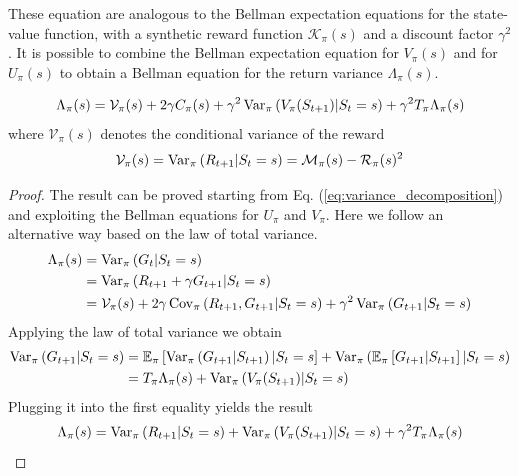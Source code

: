 These equation are analogous to the Bellman expectation equations for the state-value function, with a synthetic reward function $\mathcal{K}_\pi(s)$ and a discount factor $\gamma^2$. It is possible to combine the Bellman expectation equation for $V_\pi(s)$ and for $U_\pi(s)$ to obtain a Bellman equation for the return variance $\Lambda_\pi(s)$.
\begin{proposition}
	\begin{equation}
			\Lambda_\pi(s) = \mathcal{V}_\pi(s) + 2 \gamma C_\pi(s) + \gamma^2 \Var[\pi]{V_\pi(S_{t+1}) | S_t = s} + \gamma^2 T_\pi \Lambda_\pi(s)	
	\end{equation}
	where $\mathcal{V}_\pi(s)$ denotes the conditional variance of the reward
	\begin{equation}
		\mathcal{V}_\pi(s) = \Var[\pi]{R_{t+1} | S_t = s} = \calM_\pi(s) - \calR_\pi(s)^2
	\end{equation}
\end{proposition}
\begin{proof}
The result can be proved starting from Eq. (\ref{eq:variance_decomposition}) and exploiting the Bellman equations for $U_\pi$ and $V_\pi$. Here we follow an alternative way based on the law of total variance.
\begin{equation*}
\begin{split}
		\Lambda_\pi(s) &= \Var[\pi]{G_t | S_t = s}\\
					   &= \Var[\pi]{R_{t+1} + \gamma G_{t+1} | S_t = s}\\
					   &= \mathcal{V}_\pi(s) + 2 \gamma \Cov[\pi]{R_{t+1}, G_{t+1} | S_t = s} + \gamma^2 \Var[\pi]{G_{t+1} | S_t = s}\\
\end{split}
\end{equation*}
Applying the law of total variance we obtain
\begin{equation*}
	\begin{split}
	\Var[\pi]{G_{t+1} | S_t = s} &= \E[\pi]{ \Var[\pi]{G_{t+1} | S_{t+1}} | S_t = s} + \Var[\pi]{\E[\pi]{G_{t+1} | S_{t+1}} | S_t = s}\\
	&= T_\pi \Lambda_\pi(s) + \Var[\pi]{V_\pi(S_{t+1}) | S_t = s}
	\end{split}
\end{equation*}
Plugging it into the first equality yields the result
\begin{equation*}
	\Lambda_\pi(s) = \Var[\pi]{R_{t+1} | S_t = s} + \Var[\pi]{V_\pi(S_{t+1}) | S_t = s} + \gamma^2 T_\pi \Lambda_\pi(s)
\end{equation*}
\end{proof}
